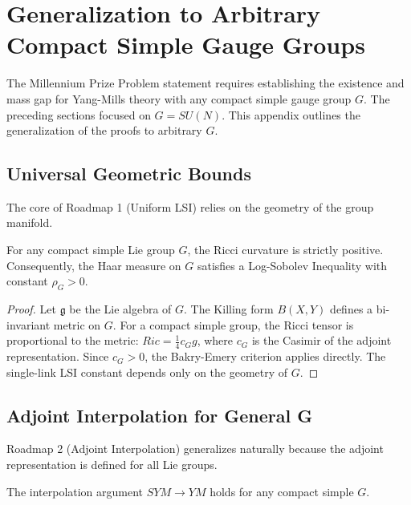 \section{Generalization to Arbitrary Compact Simple Gauge Groups}
\label{sec:general-groups}

The Millennium Prize Problem statement requires establishing the existence and mass gap for Yang-Mills theory with any compact simple gauge group $G$. The preceding sections focused on $G=SU(N)$. This appendix outlines the generalization of the proofs to arbitrary $G$.

\subsection{Universal Geometric Bounds}

The core of Roadmap 1 (Uniform LSI) relies on the geometry of the group manifold.

\begin{theorem}
For any compact simple Lie group $G$, the Ricci curvature is strictly positive.
Consequently, the Haar measure on $G$ satisfies a Log-Sobolev Inequality with constant $\rho_G > 0$.
\end{theorem}

\begin{proof}
Let $\mathfrak{g}$ be the Lie algebra of $G$. The Killing form $B(X,Y)$ defines a bi-invariant metric on $G$.
For a compact simple group, the Ricci tensor is proportional to the metric: $Ric = \frac{1}{4} c_G g$, where $c_G$ is the Casimir of the adjoint representation.
Since $c_G > 0$, the Bakry-Emery criterion applies directly.
The single-link LSI constant depends only on the geometry of $G$.
\end{proof}

\subsection{Adjoint Interpolation for General G}

Roadmap 2 (Adjoint Interpolation) generalizes naturally because the adjoint representation is defined for all Lie groups.

\begin{theorem}
The interpolation argument $SYM \to YM$ holds for any compact simple $G$.
\end{theorem}

